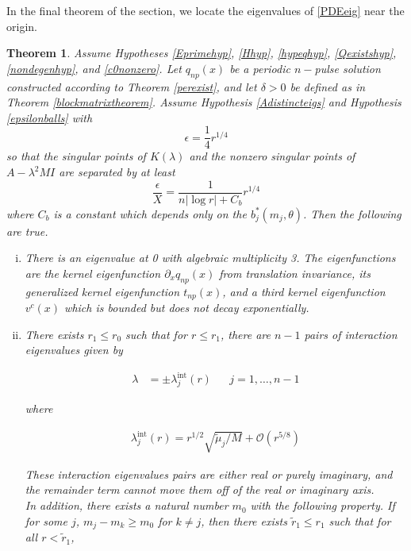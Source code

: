 \documentclass[12pt]{article}
\newtheorem{theorem}{Theorem}
\begin{document}
In the final theorem of the section, we locate the eigenvalues of \eqref{PDEeig} near the origin.


\begin{theorem}\label{locateeigtheorem}
Assume Hypotheses \ref{Eprimehyp}, \ref{Hhyp}, \ref{hypeqhyp}, \ref{Qexistshyp}, \ref{nondegenhyp}, and \ref{c0nonzero}. Let $q_{np}(x)$ be a periodic $n-$pulse solution constructed according to Theorem \ref{perexist}, and let $\delta > 0$ be defined as in Theorem \ref{blockmatrixtheorem}. Assume Hypothesis \ref{Adistincteigs} and Hypothesis \ref{epsilonballs} with
\[
\epsilon = \frac{1}{4}r^{1/4}
\]
so that the singular points of $K(\lambda)$ and the nonzero singular points of $A - \lambda^2 M I$ are separated by at least
\[
\frac{\epsilon}{X} = \frac{1}{n |\log r| + C_b} r^{1/4}
\]
where $C_b$ is a constant which depends only on the $b_j^*(m_j, \theta)$. Then the following are true.

\begin{enumerate}[(i)]

\item There is an eigenvalue at 0 with algebraic multiplicity 3. The eigenfunctions are the kernel eigenfunction $\partial_x q_{np}(x)$ from translation invariance, its generalized kernel eigenfunction $t_{np}(x)$, and a third kernel eigenfunction $v^c(x)$ which is bounded but does not decay exponentially.

\item There exists $r_1 \leq r_0$ such that for $r \leq r_1$, there are $n - 1$ pairs of interaction eigenvalues given by

\begin{align*}
\lambda &= \pm \lambda^{\text{int}}_j(r) && j = 1, \dots, n-1
\end{align*}

where

\begin{align*}
\lambda^{\text{int}}_j(r) = r^{1/2} \sqrt{\tilde{\mu}_j / M} + \mathcal{O}(r^{5/8})
\end{align*}

These interaction eigenvalues pairs are either real or purely imaginary, and the remainder term cannot move them off of the real or imaginary axis.\\

In addition, there exists a natural number $m_0$ with the following property. If for some $j$, $m_j - m_k \geq m_0$ for $k \neq j$, then there exists $\tilde{r}_1 \leq r_1$ such that for all $r < \tilde{r}_1$, 


\end{enumerate}
\end{theorem}
\end{document}
